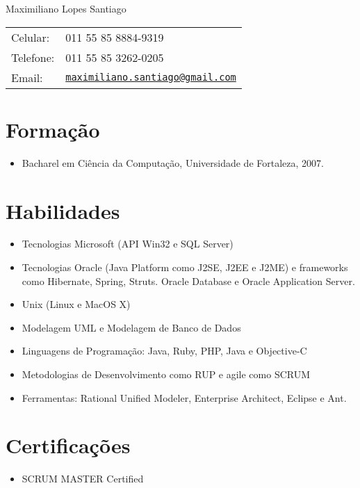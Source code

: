 \documentclass[letterpaper]{article}
\def\name{Maximiliano Lopes Santiago}
\begin{document}
\begin{flushright}

{\huge \name}


\vspace{0.25in}
\begin{minipage}{0.45\linewidth}
  \begin{tabular}{ll}
    Celular: & 011 55 85 8884-9319 \\
    Telefone: &  011 55 85 3262-0205 \\
    Email: & \href{mailto:maximiliano.santiago@gmail.com}{\tt maximiliano.santiago@gmail.com} \\
  \end{tabular}
\end{minipage}
\end{flushright}

\section*{Formação}

\begin{itemize}
  \item Bacharel em Ciência da Computação, Universidade de Fortaleza, 2007.
\end{itemize}

\section*{Habilidades}
\begin{itemize}
  \item Tecnologias Microsoft (API Win32 e SQL Server)
  \item Tecnologias Oracle (Java Platform como J2SE, J2EE e J2ME) e frameworks como Hibernate, Spring, Struts.
    Oracle Database e Oracle Application Server.
  \item Unix (Linux e MacOS X)
  \item Modelagem UML e Modelagem de Banco de Dados
  \item Linguagens de Programação: Java, Ruby, PHP, Java e Objective-C
  \item Metodologias de Desenvolvimento como RUP e agile como SCRUM
  \item Ferramentas: Rational Unified Modeler, Enterprise Architect, Eclipse e Ant.
\end{itemize}

\section*{Certificações}
\begin{itemize}
  \item SCRUM MASTER Certified
\end{itemize}
\end{document}
